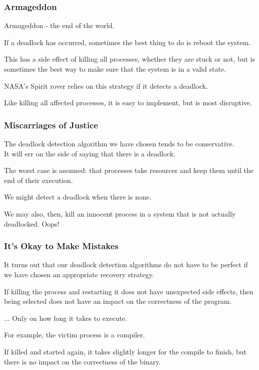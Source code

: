 \begin{frame}
	\frametitle{Armageddon}

	Armageddon - the end of the world.

	If a deadlock has occurred, sometimes the best thing to do is reboot the system.

	This has a side effect of killing all processes, whether they are stuck or not, but is sometimes the best way to make sure that the system is in a valid state.

	NASA's Spirit rover relies on this strategy if it detects a deadlock.

	Like killing all affected processes, it is easy to implement, but is most disruptive.

\end{frame}


\begin{frame}
	\frametitle{Miscarriages of Justice}

	The deadlock detection algorithm we have chosen tends to be conservative.\\
	\quad It will err on the side of saying that there is a deadlock.

	The worst case is assumed: that processes take resources and keep them until the end of their execution.

	We might detect a deadlock when there is none.

	We may also, then, kill an innocent process in a system that is not actually deadlocked. Oops!

\end{frame}

\begin{frame}
	\frametitle{It's Okay to Make Mistakes}

	It turns out that our deadlock detection algorithms do not have to be perfect if we have chosen an appropriate recovery strategy.

	If killing the process and restarting it does not have unexpected side effects, then being selected does not have an impact on the correctness of the program.

	... Only on how long it takes to execute.

	For example, the victim process is a compiler.

	If killed and started again, it takes slightly longer for the compile to finish, but there is no impact on the correctness of the binary.

\end{frame}


